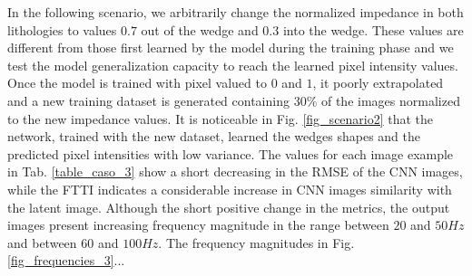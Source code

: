 \documentclass[conference]{IEEEtran}
\begin{document}
In the following scenario, we arbitrarily change the normalized impedance in both
lithologies to values $ 0.7 $ out of the wedge and $ 0.3$ into the wedge.
These values are different from those first learned by the model during the
training phase and we test the model generalization capacity to reach
the learned pixel intensity values. Once the model is trained with pixel valued to
$ 0 $ and $ 1 $, it poorly extrapolated and a new training dataset is generated containing $30\%$
of the images normalized to the new impedance values. It is noticeable in
Fig. \ref{fig_scenario2} that the network, trained with the new dataset, learned
the wedges shapes and the predicted pixel intensities with low variance. The values
for each image example in Tab. \ref{table_caso_3} show a short decreasing in the RMSE
of the CNN images, while the FTTI indicates a considerable increase in CNN images similarity with the latent image.
Although the short positive change in the metrics, the output images present increasing
frequency magnitude in the range between $ 20 $ and $ 50 Hz $ and between $ 60 $ and $ 100 Hz $.
The frequency magnitudes in Fig. \ref{fig_frequencies_3}...
\end{document}
